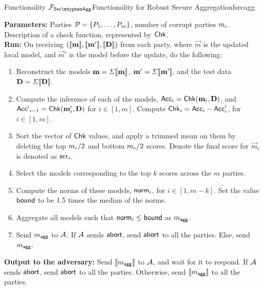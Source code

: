\begin{protofig}{Functionality $\FSecAgg$}{Functionality for Robust Secure Aggregation}{fsecagg}

    \textbf{Parameters:} Parties $\mathcal{P}_{} = \{P_1, \ldots, P_m\}$, number of corrupt parties $m_c$. Description of a check function, represented by $\mathsf{Chk}$. \\

    \textbf{Run:} On receiving $(\llbracket {\ensuremath{\mathbf{m}}}\rrbracket, \llbracket {\ensuremath{\mathbf{m}}}'\rrbracket, \llbracket {\ensuremath{\mathbf{D}}}\rrbracket)$ from each party, where $\vec m$ is the updated local model, and $\vec m'$ is the model before the update, do the following:

    \begin{enumerate}
        \item Reconstruct the models ${\mathbf{m}} = \Sigma \llbracket {\ensuremath{\mathbf{m}}}\rrbracket$, ${\mathbf{m}}' = \Sigma \llbracket {\ensuremath{\mathbf{m}}}'\rrbracket$, and the test data ${\mathbf{D}} = \Sigma \llbracket {\ensuremath{\mathbf{D}}}\rrbracket$.
        \item Compute the inference of each of the models, $\mathsf{Acc}_i = \mathsf{Chk}({\mathbf{m}}_i, {\mathbf{D}})$, and $\mathsf{Acc'}_{i - 1} = \mathsf{Chk}({\mathbf{m}}'_i, {\mathbf{D}})$ for $i \in [1, m]$. Compute $\mathsf{Chk}_i = \mathsf{Acc}_i - \mathsf{Acc}'_i$, for $i \in [1, m]$.
        \item Sort the vector of $\mathsf{Chk}$ values, and apply a trimmed mean on them by deleting the top $m_c/2$ and bottom $m_c/2$ scores. Denote the final score for $\vec m_i$ is denoted as $\mathsf{scr}_i$.
        \item Select the models corresponding to the top $k$ scores across the $m$ parties.
        \item Compute the norms of these models, $\mathsf{norm}_i$, for $i \in [1, m - k]$. Set the value $\mathsf{bound}$ to be 1.5 times the median of the norms.
        \item Aggregate all models such that $\mathsf{norm}_i \leq \mathsf{bound}$ as $m_{\mathsf{agg}}$.
        \item Send $m_{\mathsf{agg}}$ to $\mathcal{A}$. If $\mathcal{A}$ sends $\mathsf{abort}$, send $\mathsf{abort}$ to all the parties. Else, send $m_{\mathsf{agg}}$.
    \end{enumerate}

    \textbf{Output to the adversary:} Send $\llbracket m_{\mathsf{agg}}\rrbracket$ to $\mathcal{A}$, and wait for it to respond. If $\mathcal{A}$ sends $\mathsf{abort}$, send $\mathsf{abort}$ to all the parties. Otherwise, send $\llbracket m_{\mathsf{agg}}\rrbracket$ to all the parties.

\end{protofig}

